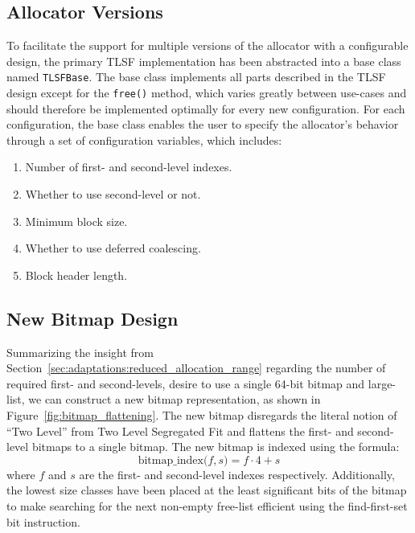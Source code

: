 
\subsection{Allocator Versions}

To facilitate the support for multiple versions of the allocator with a configurable design, the primary TLSF implementation has been abstracted into a base class named \texttt{TLSFBase}. The base class implements all parts described in the TLSF design except for the \texttt{free()} method, which varies greatly between use-cases and should therefore be implemented optimally for every new configuration. For each configuration, the base class enables the user to specify the allocator's behavior through a set of configuration variables, which includes:

\begin{enumerate}
  \item Number of first- and second-level indexes.
  \item Whether to use second-level or not.
  \item Minimum block size.
  \item Whether to use deferred coalescing.
  \item Block header length.
\end{enumerate}

\subsection{New Bitmap Design}

Summarizing the insight from Section~\ref{sec:adaptations:reduced_allocation_range} regarding the number of required first- and second-levels, desire to use a single 64-bit bitmap and large-list, we can construct a new bitmap representation, as shown in Figure~\ref{fig:bitmap_flattening}. The new bitmap disregards the literal notion of ``Two Level'' from Two Level Segregated Fit and flattens the first- and second-level bitmaps to a single bitmap. The new bitmap is indexed using the formula: 
\[
    \text{bitmap\_index($f, s$)} = f \cdot 4 + s
\]
where $f$ and $s$ are the first- and second-level indexes respectively. Additionally, the lowest size classes have been placed at the least significant bits of the bitmap to make searching for the next non-empty free-list efficient using the find-first-set bit instruction.

